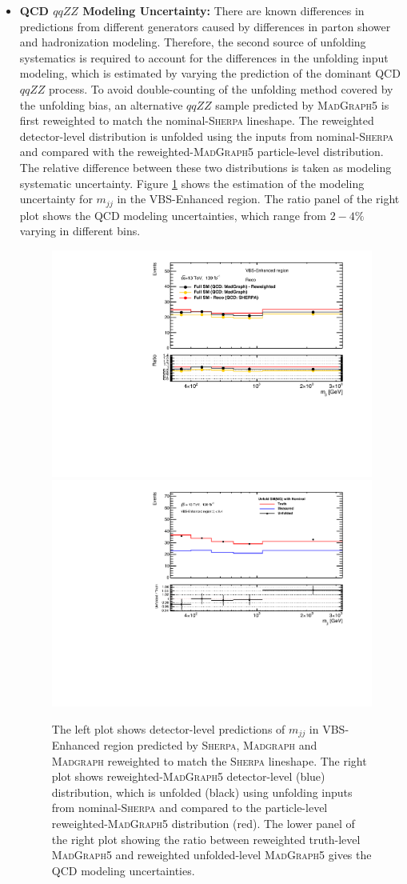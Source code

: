 \begin{itemize}
{    }

    \item{\textbf{QCD $qqZZ$ Modeling Uncertainty:} There are known differences in predictions from different generators caused by differences in parton shower and hadronization modeling. Therefore, the second source of unfolding systematics is required to account for the differences in the unfolding input modeling, which is estimated by varying the prediction of the dominant QCD $qqZZ$ process. To avoid double-counting of the unfolding method covered by the unfolding bias, an alternative $qqZZ$ sample predicted by \textsc{MadGraph5} is first reweighted to match the nominal-\textsc{Sherpa} lineshape. The reweighted detector-level distribution is unfolded using the inputs from nominal-\textsc{Sherpa} and compared with the reweighted-\textsc{MadGraph5} particle-level distribution. The relative difference between these two distributions is taken as modeling systematic uncertainty. Figure \ref{fig:QCDModelUnc} shows the estimation of the modeling uncertainty for $m_{jj}$ in the VBS-Enhanced region. The ratio panel of the right plot shows the QCD modeling uncertainties, which range from $2-4\%$ varying in different bins.
    
    \begin{figure}[!htb]
        \centering
        \includegraphics[width=.48\linewidth]{figures/Analysis/Systematics/QCDmodel_Dist.pdf}
        \includegraphics[width=.48\linewidth]{figures/Analysis/Systematics/QCDmodel_Unc.pdf}
        \caption{The left plot shows detector-level predictions of $m_{jj}$ in VBS-Enhanced region predicted by \textsc{Sherpa}, \textsc{Madgraph} and \textsc{Madgraph} reweighted to match the \textsc{Sherpa} lineshape. The right plot shows reweighted-\textsc{MadGraph5} detector-level (blue) distribution, which is unfolded (black) using unfolding inputs from nominal-\textsc{Sherpa} and compared to the particle-level reweighted-\textsc{MadGraph5} distribution (red). The lower panel of the right plot showing the ratio between reweighted truth-level \textsc{MadGraph5} and reweighted unfolded-level \textsc{MadGraph5} gives the QCD modeling uncertainties. \label{fig:QCDModelUnc}}
 \end{figure}  

    }
\end{itemize}

